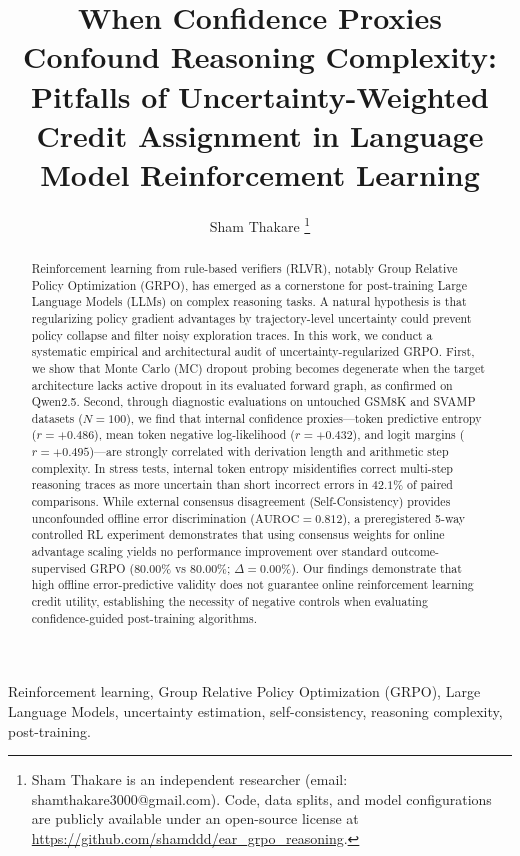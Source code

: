 \documentclass[journal]{IEEEtai}
\title{When Confidence Proxies Confound Reasoning Complexity: Pitfalls of Uncertainty-Weighted Credit Assignment in Language Model Reinforcement Learning}
\author{Sham Thakare%
\thanks{Sham Thakare is an independent researcher (email: shamthakare3000@gmail.com). Code, data splits, and model configurations are publicly available under an open-source license at \url{https://github.com/shamddd/ear_grpo_reasoning}.}}
\begin{document}
\maketitle

\begin{abstract}
Reinforcement learning from rule-based verifiers (RLVR), notably Group Relative Policy Optimization (GRPO), has emerged as a cornerstone for post-training Large Language Models (LLMs) on complex reasoning tasks. A natural hypothesis is that regularizing policy gradient advantages by trajectory-level uncertainty could prevent policy collapse and filter noisy exploration traces. In this work, we conduct a systematic empirical and architectural audit of uncertainty-regularized GRPO. First, we show that Monte Carlo (MC) dropout probing becomes degenerate when the target architecture lacks active dropout in its evaluated forward graph, as confirmed on Qwen2.5. Second, through diagnostic evaluations on untouched GSM8K and SVAMP datasets ($N=100$), we find that internal confidence proxies---token predictive entropy ($r = +0.486$), mean token negative log-likelihood ($r = +0.432$), and logit margins ($r = +0.495$)---are strongly correlated with derivation length and arithmetic step complexity. In stress tests, internal token entropy misidentifies correct multi-step reasoning traces as more uncertain than short incorrect errors in $42.1\%$ of paired comparisons. While external consensus disagreement (Self-Consistency) provides unconfounded offline error discrimination ($\text{AUROC} = 0.812$), a preregistered 5-way controlled RL experiment demonstrates that using consensus weights for online advantage scaling yields no performance improvement over standard outcome-supervised GRPO ($80.00\%$ vs $80.00\%$; $\Delta = 0.00\%$). Our findings demonstrate that high offline error-predictive validity does not guarantee online reinforcement learning credit utility, establishing the necessity of negative controls when evaluating confidence-guided post-training algorithms.
\end{abstract}

\begin{IEEEkeywords}
Reinforcement learning, Group Relative Policy Optimization (GRPO), Large Language Models, uncertainty estimation, self-consistency, reasoning complexity, post-training.
\end{IEEEkeywords}
\end{document}
